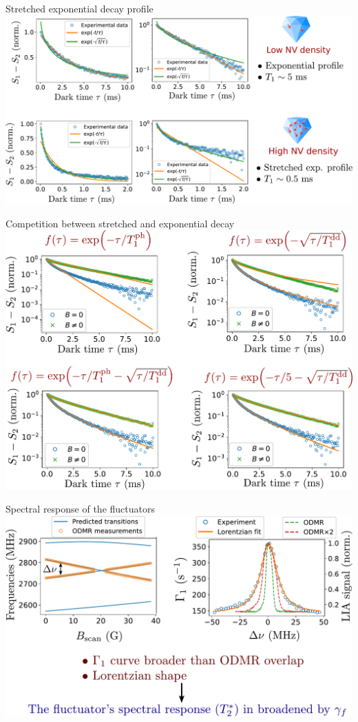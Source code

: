 \documentclass{beamer}
\begin{document}
\begin{frame}{Stretched exponential decay profile}
\centering
\includegraphics[width=\textwidth,height=0.9\textheight,keepaspectratio]{Slide_T1_exp_stretch}
\end{frame}

\begin{frame}{Competition between stretched and exponential decay}
\centering
\includegraphics[width=\textwidth,height=0.9\textheight,keepaspectratio]{Slide_T1_exp_et_stretch}
\end{frame}

\begin{frame}{Spectral response of the fluctuators}
\centering
\includegraphics[width=\textwidth,height=0.9\textheight,keepaspectratio]{Slide_fluct_linewidth}
\end{frame}
\end{document}
